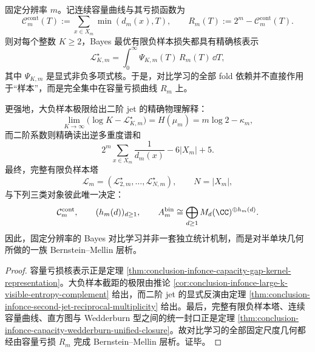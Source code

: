 \begin{theorem}\label{thm:conclusion-contrastive-learning-bernstein-mellin-capacity-defect-tomography}
固定分辨率 \(m\)。记连续容量曲线与其亏损函数为
\[
\mathcal C_m^{\mathrm{cont}}(T):=\sum_{x\in X_m}\min(d_m(x),T),
\qquad
R_m(T):=2^m-\mathcal C_m^{\mathrm{cont}}(T).
\]
则对每个整数 \(K\ge 2\)，Bayes 最优有限负样本损失都具有精确核表示
\[
\mathcal L_{K,m}^{\star}
=
\int_0^\infty \Psi_{K,m}(T)\,R_m(T)\,\dd T,
\]
其中 \(\Psi_{K,m}\) 是显式非负多项式核。于是，对比学习的全部 fold 依赖并不直接作用于“样本”，而是完全集中在容量亏损曲线 \(R_m\) 上。

更强地，大负样本极限给出二阶 jet 的精确物理解释：
\[
\lim_{K\to\infty}\bigl(\log K-\mathcal L_{K,m}^{\star}\bigr)=H(\mu_m)=m\log 2-\kappa_m,
\]
而二阶系数则精确读出逆多重度谱和
\[
2^m\sum_{x\in X_m}\frac1{d_m(x)}-6|X_m|+5.
\]
最终，完整有限负样本塔
\[
\mathscr L_m=(\mathcal L_{2,m}^{\star},\dots,\mathcal L_{N,m}^{\star}),
\qquad N=|X_m|,
\]
与下列三类对象彼此唯一决定：
\[
\mathcal C_m^{\mathrm{cont}},
\qquad
(h_m(d))_{d\ge 1},
\qquad
A_m^{\mathrm{bin}}\cong \bigoplus_{d\ge 1}M_d(\CC)^{\oplus h_m(d)}.
\]
因此，固定分辨率的 Bayes 对比学习并非一套独立统计机制，而是对半单块几何所做的一族 Bernstein--Mellin 层析。
\end{theorem}
\begin{proof}
容量亏损核表示正是定理 \ref{thm:conclusion-infonce-capacity-gap-kernel-representation}。大负样本截距的极限由推论 \ref{cor:conclusion-infonce-large-k-visible-entropy-complement} 给出，而二阶 jet 的显式反演由定理 \ref{thm:conclusion-infonce-second-jet-reciprocal-multiplicity} 给出。最后，完整有限负样本塔、连续容量曲线、直方图与 Wedderburn 型之间的统一封口正是定理 \ref{thm:conclusion-infonce-capacity-wedderburn-unified-closure}。故对比学习的全部固定尺度几何都经由容量亏损 \(R_m\) 完成 Bernstein--Mellin 层析。证毕。
\end{proof}

